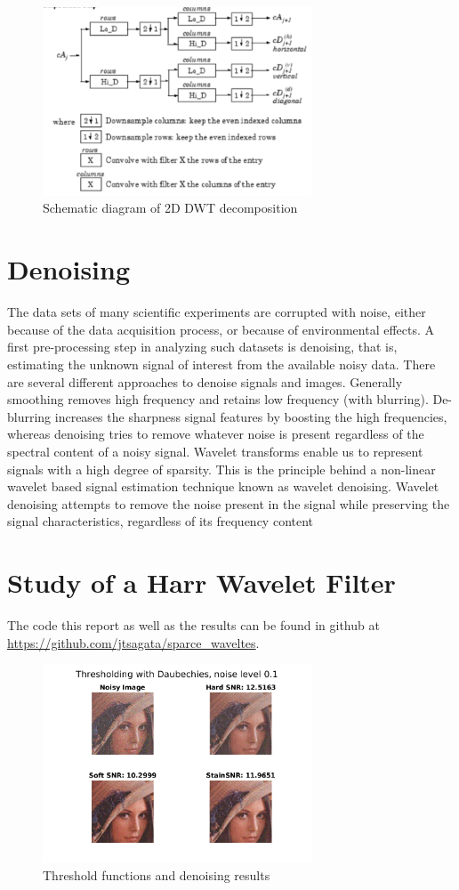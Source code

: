 \documentclass[a4paper,12pt]{article}
\begin{document}
\begin{figure}[]
        \centering
        \includegraphics[width=8cm]{diagram2.png}
        \caption{Schematic diagram of 2D DWT decomposition}
		\label{fig:wave2}
\end{figure}


\section {Denoising}
The data sets of many scientific experiments are corrupted with noise, either because of the data acquisition process, or because of environmental effects. A first pre-processing step in analyzing such datasets is denoising, that is, estimating the unknown signal of interest from the available noisy data. There are several different approaches to denoise signals and images. Generally smoothing removes high frequency and retains low frequency (with blurring). De-blurring increases the sharpness signal features by boosting the high frequencies, whereas denoising tries to remove whatever noise is present regardless of the spectral content of a noisy signal. Wavelet transforms enable us to represent signals with a high degree of sparsity. This is the principle behind a non-linear wavelet based signal estimation technique known as wavelet denoising. Wavelet denoising attempts to remove the noise present in the signal while preserving the signal characteristics, regardless of its frequency content

\section{Study of a Harr Wavelet Filter}
The code this report as well as the results can be found in  github at \url{https://github.com/jtsagata/sparce_waveltes}.


\begin{figure}[t]
        \centering
        \includegraphics[width=8cm]{../Results/leana_threshold.png}
        \caption{Threshold functions and denoising results}
		\label{fig:threshold}
\end{figure}
\end{document}
